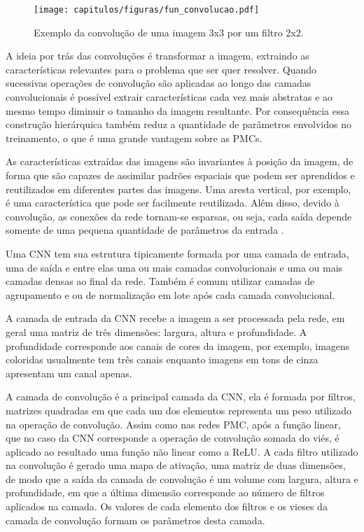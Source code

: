 \begin{figure}[!ht]
    \centering
    \texttt{[image: capitulos/figuras/fun\_convolucao.pdf]}
    \caption{Exemplo da convolução de uma imagem 3x3 por um filtro 2x2.}
    \label{fig:fun_convolucao}
\end{figure}

A ideia por trás das convoluções é transformar a imagem, extraindo as características relevantes para o problema que ser quer resolver. Quando sucessivas operações de convolução são aplicadas ao longo das camadas convolucionais é possível extrair características cada vez mais abstratas e ao mesmo tempo diminuir o tamanho da imagem resultante. Por consequência essa construção hierárquica também reduz a quantidade de parâmetros envolvidos no treinamento, o que é uma grande vantagem sobre as PMCs.

As características extraídas das imagens são invariantes à posição da imagem, de forma que são capazes de assimilar padrões espaciais que podem ser aprendidos e  reutilizados em diferentes partes das imagens. Uma aresta vertical, por exemplo, é uma característica que pode ser facilmente reutilizada. Além disso, devido à convolução, as conexões da rede tornam-se esparsas, ou seja, cada saída depende somente de uma pequena quantidade de parâmetros da entrada \cite{zhang2020dive}.

Uma CNN tem sua estrutura tipicamente formada por uma camada de entrada, uma de saída e entre elas uma ou mais camadas convolucionais e uma ou mais camadas densas ao final da rede. Também é comum utilizar camadas de agrupamento e ou de normalização em lote após cada camada convolucional.

A camada de entrada da CNN recebe a imagem a ser processada pela rede, em geral uma matriz de três dimensões: largura, altura e profundidade. A profundidade corresponde aos canais de cores da imagem, por exemplo, imagens coloridas usualmente tem três canais enquanto imagens em tons de cinza apresentam um canal apenas.

A camada de convolução é a principal camada da CNN, ela é formada por filtros, matrizes quadradas em que cada um dos elementos representa um peso utilizado na operação de convolução. Assim como nas redes PMC, após a função linear, que no caso da CNN corresponde a operação de convolução somada do viés, é aplicado ao resultado uma função não linear como a ReLU. A cada filtro utilizado na convolução é gerado uma mapa de ativação, uma matriz de duas dimensões, de modo que a saída da camada de convolução é um volume com largura, altura e profundidade, em que a última dimensão corresponde ao número de filtros aplicados na camada. Os valores de cada elemento dos filtros e os vieses da camada de convolução formam os parâmetros desta camada.

